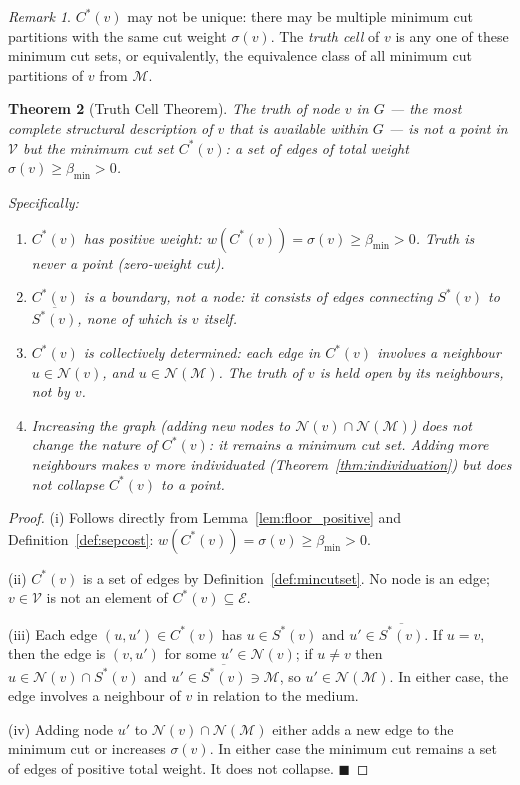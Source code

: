 \documentclass[12pt, a4paper]{article}
\theoremstyle{plain}
\newtheorem{theorem}{Theorem}[section]
\theoremstyle{definition}
\theoremstyle{remark}
\newtheorem{remark}[theorem]{Remark}
\newcommand{\med}{\mathcal{M}}
\newcommand{\Nbd}{\mathcal{N}}
\newcommand{\Ecal}{\mathcal{E}}
\newcommand{\Vcal}{\mathcal{V}}
\newcommand{\bmin}{\beta_{\min}}
\newcommand{\qed}{\hfill$\blacksquare$}
\begin{document}
\begin{remark}
$C^*(v)$ may not be unique: there may be multiple minimum cut partitions
with the same cut weight $\sigma(v)$. The \emph{truth cell} of $v$ is any
one of these minimum cut sets, or equivalently, the equivalence class of all
minimum cut partitions of $v$ from $\med$.
\end{remark}

\begin{theorem}[Truth Cell Theorem]
\label{thm:truth_cell}
The truth of node $v$ in $G$ --- the most complete structural description of
$v$ that is available within $G$ --- is not a point in $\Vcal$ but the
minimum cut set $C^*(v)$: a set of edges of total weight $\sigma(v) \geq
\bmin > 0$.

Specifically:
\begin{enumerate}[label=(\roman*)]
  \item $C^*(v)$ has positive weight: $w(C^*(v)) = \sigma(v) \geq \bmin > 0$.
  Truth is never a point (zero-weight cut).

  \item $C^*(v)$ is a boundary, not a node: it consists of edges
  connecting $S^*(v)$ to $\overline{S^*(v)}$, none of which is $v$ itself.

  \item $C^*(v)$ is collectively determined: each edge in $C^*(v)$ involves
  a neighbour $u \in \Nbd(v)$, and $u \in \Nbd(\med)$. The truth of $v$
  is held open by its neighbours, not by $v$.

  \item Increasing the graph (adding new nodes to $\Nbd(v) \cap \Nbd(\med)$)
  does not change the nature of $C^*(v)$: it remains a minimum cut set.
  Adding more neighbours makes $v$ more individuated (Theorem~\ref{thm:individuation})
  but does not collapse $C^*(v)$ to a point.
\end{enumerate}
\end{theorem}

\begin{proof}
(i) Follows directly from Lemma~\ref{lem:floor_positive} and
Definition~\ref{def:sepcost}: $w(C^*(v)) = \sigma(v) \geq \bmin > 0$.

(ii) $C^*(v)$ is a set of edges by Definition~\ref{def:mincutset}. No node
is an edge; $v \in \Vcal$ is not an element of $C^*(v) \subseteq \Ecal$.

(iii) Each edge $(u, u') \in C^*(v)$ has $u \in S^*(v)$ and $u' \in
\overline{S^*(v)}$. If $u = v$, then the edge is $(v, u')$ for some
$u' \in \Nbd(v)$; if $u \neq v$ then $u \in \Nbd(v) \cap S^*(v)$ and
$u' \in \overline{S^*(v)} \ni \med$, so $u' \in \Nbd(\med)$. In either
case, the edge involves a neighbour of $v$ in relation to the medium.

(iv) Adding node $u'$ to $\Nbd(v) \cap \Nbd(\med)$ either adds a new
edge to the minimum cut or increases $\sigma(v)$. In either case the minimum
cut remains a set of edges of positive total weight. It does not collapse. \qed
\end{proof}
\end{document}
